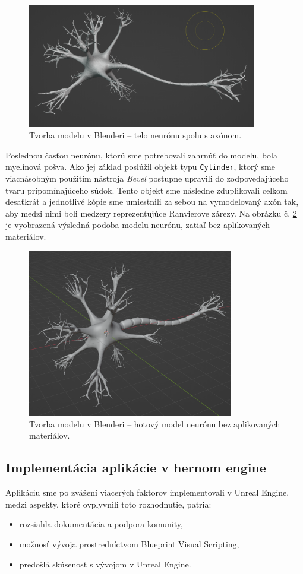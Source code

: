 \begin{figure}[!htbp]
  \centering
  \includegraphics[width=10cm]{img/n5-crop.png}
  \caption{Tvorba modelu v Blenderi {--} telo neurónu spolu s axónom.}
  \label{blender4}
\end{figure}	

Poslednou časťou neurónu, ktorú sme potrebovali zahrnúť do modelu, bola myelínová pošva. Ako jej základ poslúžil objekt typu \texttt{Cylinder}, ktorý sme viacnásobným použitím nástroja \emph{Bevel} postupne
upravili do zodpovedajúceho tvaru pripomínajúceho súdok. Tento objekt sme následne zduplikovali celkom desaťkrát a jednotlivé kópie sme umiestnili za sebou na vymodelovaný axón tak, aby medzi 
nimi boli medzery reprezentujúce Ranvierove zárezy. Na obrázku č. \ref{blender5} je vyobrazená výsledná podoba modelu neurónu, zatiaľ bez aplikovaných materiálov.
 
\begin{figure}[!htbp]
  \centering
  \includegraphics[width=9cm]{img/finalModel-crop.png}
  \caption{Tvorba modelu v Blenderi {--} hotový model neurónu bez aplikovaných materiálov.}
  \label{blender5}
\end{figure}

\subsection{Implementácia aplikácie v hernom engine}\label{gameengine}
Aplikáciu sme po zvážení viacerých faktorov implementovali v Unreal Engine. medzi aspekty, ktoré ovplyvnili toto rozhodnutie, patria:
\begin{itemize}
  \item rozsiahla dokumentácia a podpora komunity,
  \item možnosť vývoja prostredníctvom Blueprint Visual Scripting,
  \item predošlá skúsenosť s vývojom v Unreal Engine.
\end{itemize}

